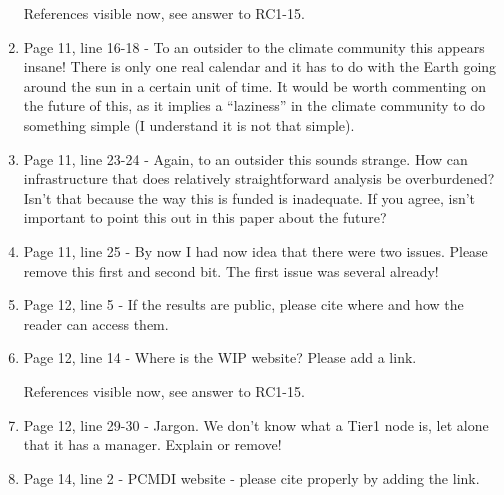 \documentclass[gmd,manuscript]{copernicus}
\newenvironment{answer}{\color{blue}}{}
\begin{document}
\begin{enumerate}[label=RC3-\arabic*,leftmargin=*]
  \begin{answer}
    References visible now, see answer to RC1-15.
  \end{answer}
\item Page 11, line 16-18 - To an outsider to the climate community
  this appears insane! There is only one real calendar and it has to
  do with the Earth going around the sun in a certain unit of time. It
  would be worth commenting on the future of this, as it implies a
  “laziness” in the climate community to do something simple (I
  understand it is not that simple).
\item Page 11, line 23-24 - Again, to an outsider this sounds strange.
  How can infrastructure that does relatively straightforward analysis
  be overburdened? Isn’t that because the way this is funded is
  inadequate. If you agree, isn’t important to point this out in this
  paper about the future?
\item Page 11, line 25 - By now I had now idea that there were two
  issues. Please remove this first and second bit. The first issue was
  several already!
\item Page 12, line 5 - If the results are public, please cite where
  and how the reader can access them.
\item Page 12, line 14 - Where is the WIP website? Please add a link.

  \begin{answer}
    References visible now, see answer to RC1-15.
  \end{answer}
\item Page 12, line 29-30 - Jargon. We don’t know what a Tier1 node
  is, let alone that it has a manager. Explain or remove!
\item Page 14, line 2 - PCMDI website - please cite properly by adding
  the link.


\end{enumerate}
\end{document}
